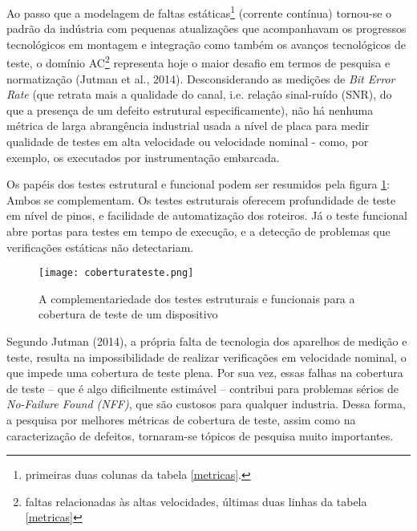 Ao passo que a modelagem de faltas estáticas\footnote{primeiras duas colunas da tabela \ref{metricas}.} (corrente contínua) tornou-se o padrão da indústria com pequenas atualizações que acompanhavam os progressos tecnológicos em montagem e integração como também os avanços tecnológicos de teste, o domínio AC\footnote{faltas relacionadas às altas velocidades, últimas duas linhas da tabela \ref{metricas}} representa hoje o maior desafio em termos de pesquisa e normatização (Jutman et al., 2014). Desconsiderando as medições de \textit{Bit Error Rate} (que retrata mais a qualidade do canal, i.e. relação sinal-ruído (SNR), do que a presença de um defeito estrutural especificamente), não há nenhuma métrica de larga abrangência industrial usada a nível de placa para medir qualidade de testes em alta velocidade ou velocidade nominal - como, por exemplo, os executados por instrumentação embarcada.

Os papéis dos testes estrutural e funcional podem ser resumidos pela figura \ref{fig:cobertura}:  Ambos se complementam. Os testes estruturais oferecem profundidade de teste em nível de pinos, e facilidade de automatização dos roteiros. Já o teste funcional abre portas para testes em tempo de execução, e a detecção de problemas que verificações estáticas não detectariam.

\begin{figure}[ht]
    \centering
    \texttt{[image: coberturateste.png]}
    \caption{A complementariedade dos testes estruturais e funcionais para a cobertura de teste de um dispositivo}
    \label{fig:cobertura}
\end{figure}

Segundo Jutman (2014), a própria falta de tecnologia dos aparelhos de medição e teste, resulta na impossibilidade de realizar verificações em velocidade nominal, o que impede uma cobertura de teste plena. Por sua vez, essas falhas na cobertura de teste -- que é algo dificilmente estimável -- contribui para problemas sérios de \textit{No-Failure Found (NFF)}, que são custosos para qualquer industria. Dessa forma, a pesquisa por melhores métricas de cobertura de teste, assim como na caracterização de defeitos, tornaram-se tópicos de pesquisa muito importantes.




